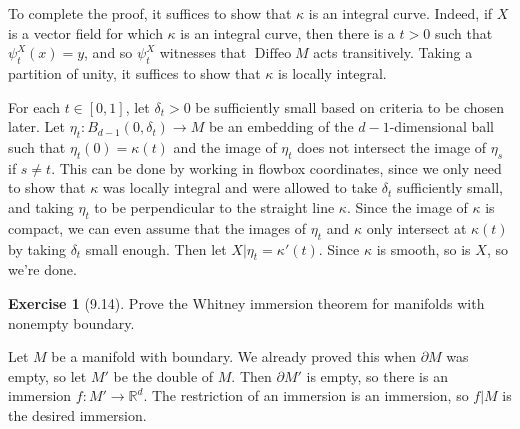 \documentclass[10pt]{article}
\newcommand{\RR}{\mathbb{R}}
\DeclareMathOperator{\Diffeo}{Diffeo}
\theoremstyle{definition}
\newtheorem{exer}{Exercise}
\begin{document}
To complete the proof, it suffices to show that $\kappa$ is an integral curve.
Indeed, if $X$ is a vector field for which $\kappa$ is an integral curve, then there is a $t > 0$ such that $\psi^X_t(x) = y$, and so $\psi^X_t$ witnesses that $\Diffeo M$ acts transitively.
Taking a partition of unity, it suffices to show that $\kappa$ is locally integral.

For each $t \in [0, 1]$, let $\delta_t > 0$ be sufficiently small based on criteria to be chosen later.
Let $\eta_t: B_{d-1}(0, \delta_t) \to M$ be an embedding of the $d-1$-dimensional ball such that $\eta_t(0) = \kappa(t)$ and the image of $\eta_t$ does not intersect the image of $\eta_s$ if $s \neq t$.
This can be done by working in flowbox coordinates, since we only need to show that $\kappa$ was locally integral and were allowed to take $\delta_t$ sufficiently small, and taking $\eta_t$ to be perpendicular to the straight line $\kappa$.
Since the image of $\kappa$ is compact, we can even assume that the images of $\eta_t$ and $\kappa$ only intersect at $\kappa(t)$ by taking $\delta_t$ small enough.
Then let $X|\eta_t = \kappa'(t)$.
Since $\kappa$ is smooth, so is $X$, so we're done.


\begin{exer}[9.14]
Prove the Whitney immersion theorem for manifolds with nonempty boundary.
\end{exer}

Let $M$ be a manifold with boundary.
We already proved this when $\partial M$ was empty, so let $M'$ be the double of $M$.
Then $\partial M'$ is empty, so there is an immersion $f: M' \to \RR^d$.
The restriction of an immersion is an immersion, so $f|M$ is the desired immersion.
\end{document}
